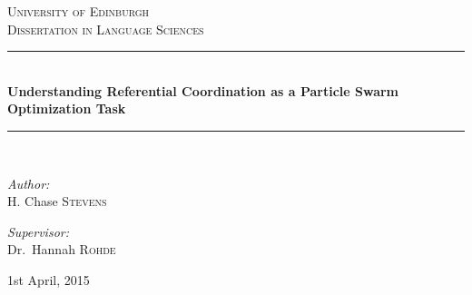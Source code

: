 \documentclass[12pt,a4paper]{article}
\newcommand{\HRule}{\rule{\linewidth}{0.5mm}}
\begin{document}
\begin{titlepage}

\begin{center}

\textsc{\LARGE University of Edinburgh}\\[1cm]

\textsc{\Large Dissertation in Language Sciences}\\[1.5cm]

\HRule \\[0.4cm]
{ \huge \bfseries Understanding Referential Coordination as a Particle Swarm Optimization Task \\[0.4cm] }

\HRule \\[1.5cm]


\noindent
\begin{minipage}{0.4\textwidth}
\begin{flushleft} \large
\emph{Author:}\\
H. Chase \textsc{Stevens}
\end{flushleft}
\end{minipage}%
\begin{minipage}{0.4\textwidth}
\begin{flushright} \large
\emph{Supervisor:} \\
Dr.~Hannah \textsc{Rohde}
\end{flushright}
\end{minipage}

\vfill

{\large 1st April, 2015}


\end{center}
\end{titlepage}

\doublespace
\end{document}
